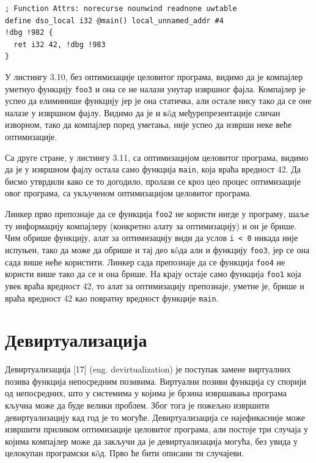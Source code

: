 \documentclass[12pt,oneside]{memoir}
\begin{document}
\begin{lstlisting}[frame=single,caption={Međureprezentacija sa optimizacijom celovitog programa }, captionpos=b]
; Function Attrs: norecurse nounwind readnone uwtable
define dso_local i32 @main() local_unnamed_addr #4 
!dbg !982 {
  ret i32 42, !dbg !983
}
\end{lstlisting}

У листингу 3.10, без оптимизације целовитог програма, видимо да је компајлер уметнуо
функцију \texttt{foo3} и она се не налази унутар извршног фајла.
Компајлер је успео да елиминише функцију јер је она статичка, али остале нису
тако да се оне налазе у извршном фајлу.
Видимо да је и к\^{o}д међурепрезентације сличан изворном, тако да компајлер поред
уметања, није успео да изврши неке веће оптимизације.

Са друге стране, у листингу 3.11, са оптимизацијом целовитог програма, видимо да је у
извршном фајлу остала само функција \texttt{main}, која враћа вредност 42.
Да бисмо утврдили како се то догодило, пролази се кроз цео процес оптимизације овог 
програма, са укљученом оптимизацијом целовитог програма.
\par
Линкер прво препознаје да се функција \texttt{foo2} не користи нигде у програму, шаље ту
информацију компајлеру (конкретно алату за оптимизацију) и он је брише.
Чим обрише функцију, алат за оптимизацију види да услов \texttt{i < 0} никада није испуњен,
тако да може да обрише и тај део к\^{o}да али и функцију \texttt{foo3}, јер се она сада
више неће користити.
Линкер сада препознаје да се функција \texttt{foo4} не користи више тако да се и она брише.
На крају остаје само функција \texttt{foo1} која увек враћа вредност 42, то алат за оптимизацију
препознаје, уметне је, брише и враћа вредност 42 као повратну вредност функције
\texttt{main}.

\section{Девиртуализација}
 Девиртуализација [17] (eng. devirtualization) је поступак замене виртуалних позива
 функција непосредним позивима.
 Виртуални позиви функција су спорији од непосредних, што у системима
 у којима је брзина извршавања програма кључна може да буде велики проблем.
 Због тога је пожељно извршити девиртуализацију кад год је то могуће.
 Девиртуализација се најефикасније може извршити приликом оптимизације целовитог
 програма, али постоје три случаја у којима компајлер може да закључи да је 
 девиртуализација могућа, без увида у целокупан програмски к\^{o}д.
 Прво ће бити описани ти случајеви.
 
\end{document}
